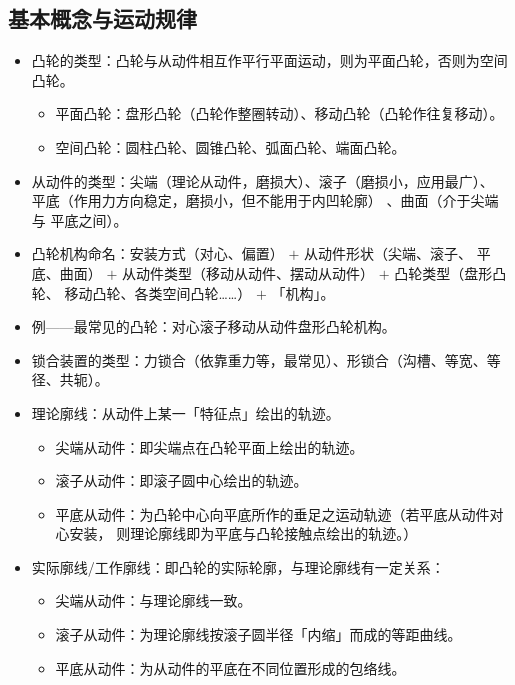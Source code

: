 \documentclass[12pt,a4paper]{article}
\newcommand{\tightlist}{\setlength{\parskip}{0pt}\setlength{\itemsep}{0pt}}
\newcommand{\hint}[1]{\textsf{（#1）}}
\newcommand{\minor}[1]{{\color{gray} #1}}
\begin{document}
\subsection{基本概念与运动规律}
\begin{itemize}\tightlist
    \item 凸轮的类型：凸轮与从动件相互作平行平面运动，则为平面凸轮，否则为空间凸轮。
    \begin{itemize}\tightlist
        \item 平面凸轮：盘形凸轮\hint{凸轮作整圈转动}、移动凸轮\hint{凸轮作往复移动}。
        \item \minor{空间凸轮：圆柱凸轮、圆锥凸轮、弧面凸轮、端面凸轮。}
    \end{itemize}
    \item 从动件的类型：尖端\hint{理论从动件，磨损大}、滚子\hint{磨损小，应用最广}、
    平底\hint{作用力方向稳定，磨损小，但不能用于内凹轮廓}\minor{、曲面\hint{介于尖端与
    平底之间}}。
    \item 凸轮机构命名：安装方式\hint{对心、偏置} $+$ 从动件形状\hint{尖端、滚子、
    平底、曲面} $+$ 从动件类型\hint{移动从动件、摆动从动件} $+$ 凸轮类型\hint{盘形凸轮、
    移动凸轮、各类空间凸轮……} $+$ 「机构」。
    \item 例——最常见的凸轮：对心滚子移动从动件盘形凸轮机构。
    \item 锁合装置的类型：力锁合\hint{依靠重力等，最常见}、形锁合\hint{沟槽、等宽、等
    径、共轭}。
    \item 理论廓线：从动件上某一「特征点」绘出的轨迹。
    \begin{itemize}\tightlist
        \item 尖端从动件：即尖端点在凸轮平面上绘出的轨迹。
        \item 滚子从动件：即滚子圆中心绘出的轨迹。
        \item 平底从动件：为凸轮中心向平底所作的垂足之运动轨迹\hint{若平底从动件对心安装，
        则理论廓线即为平底与凸轮接触点绘出的轨迹。}
    \end{itemize}
    \item 实际廓线/工作廓线：即凸轮的实际轮廓，与理论廓线有一定关系：
    \begin{itemize}\tightlist
        \item 尖端从动件：与理论廓线一致。
        \item 滚子从动件：为理论廓线按滚子圆半径「内缩」而成的等距曲线。
        \item 平底从动件：为从动件的平底在不同位置形成的包络线。
    \end{itemize}

\end{itemize}
\end{document}
